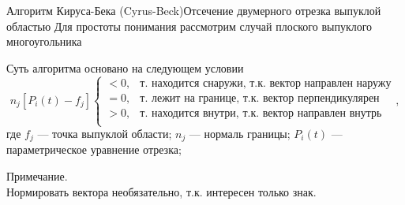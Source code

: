 \documentclass{beamer}
\begin{document}
	\begin{frame}{Алгоритм Кируса-Бека (Cyrus-Beck)}{Отсечение двумерного отрезка выпуклой областью}
		Для простоты понимания рассмотрим случай плоского выпуклого многоугольника

		Суть алгоритма основано на следующем условии
		\[
			n_j [P_i(t) - f_j]
			\begin{cases}
				< 0, & \text{т. находится снаружи, т.к. вектор направлен наружу} \\
				= 0, & \text{т. лежит на границе, т.к. вектор перпендикулярен} \\
				> 0, & \text{т. находится внутри, т.к. вектор направлен внутрь} \\
			\end{cases}
			,
		\]
		где
		$f_j$ --- точка выпуклой области;
		$n_j$ --- нормаль границы;
		$P_i(t)$ --- параметрическое уравнение отрезка;
		
		Примечание. \\ Нормировать вектора необязательно, т.к. интересен только знак.

\end{frame}
\end{document}
